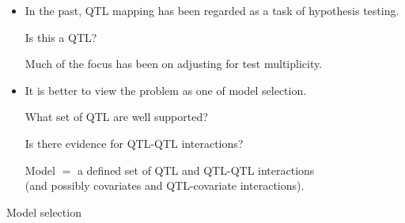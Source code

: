 \documentclass[12pt]{article}
\newcommand{\headsize}{\fontsize{35}{35} \selectfont}
\newcommand{\smallersize}{\fontsize{20}{25} \selectfont}
\begin{document}
\color{mywhite} \smallersize

\hfill \begin{minipage}[t]{10in}
\begin{itemize}
\itemsep20mm
\item In the past, QTL mapping has been regarded as a task of
  {\color{mypink} hypothesis testing}.

\vspace{10mm}

\hspace{15mm} {\color{myblue} Is this a QTL?}

\vspace{10mm}

Much of the focus has been on adjusting for test multiplicity.
   
\item It is better to view the problem as one of {\color{mypink} model
  selection}.

\vspace{10mm}

\hspace{15mm} {\color{myblue} What set of QTL are well supported?}

\hspace{15mm} {\color{myblue} Is there evidence for QTL-QTL
  interactions?}

\vspace{10mm}

{\color{mypink} Model} $\mathsf{=}$ a defined set of QTL and QTL-QTL interactions
\\
(and possibly covariates and QTL-covariate interactions).

\end{itemize}
\end{minipage}

\newpage

\headsize \color{myyellow}
\hfill \begin{minipage}{5.75in}
\centering
Model selection
\end{minipage}

\vspace{15mm} \color{mywhite} \smallersize
\end{document}
